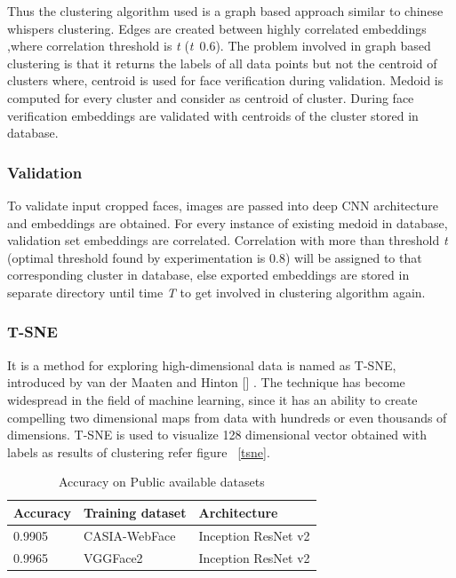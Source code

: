\documentclass[a4paper,12pt, twoside]{NITKReport}
\begin{document}
\par Thus the clustering algorithm used is a graph based approach similar to chinese whispers clustering. Edges are created between highly correlated embeddings ,where correlation threshold is \textit{t} (\textit{t}~0.6). The problem involved in graph based clustering is that it returns the labels of all data points but not the centroid of clusters where, centroid is used for face verification during validation. Medoid is computed for every cluster and consider as centroid of cluster. During face verification embeddings are validated with centroids of the cluster stored in database.

\subsubsection{Validation}
To validate input cropped faces, images are passed into deep CNN architecture and embeddings are obtained. For every instance of existing medoid in database, validation set embeddings are correlated. Correlation with more than threshold 
\textit{t} (optimal threshold found by experimentation is 0.8) will be assigned to that corresponding cluster in database, else exported embeddings are stored in separate directory until time \textit{T} to get involved in clustering algorithm again. 

\subsubsection{T-SNE}
It is a method for exploring high-dimensional data is named as T-SNE, introduced by van der Maaten and Hinton [\cite{maaten2008visualizing}] . The technique has become widespread in the field of machine learning, since it has an ability to create compelling two dimensional maps from data with hundreds or even thousands of dimensions. T-SNE is used to visualize 128 dimensional vector obtained with labels as results of clustering refer figure ~\ref{tsne}.

\begin{table}[h]
  \centering
\begin{tabular}{ |p{4cm}|p{4cm}|p{4cm}|}
\hline
Accuracy & Training dataset & Architecture\\
\hline
0.9905 & CASIA-WebFace & Inception ResNet v2 \\
\hline
0.9965 & VGGFace2 &	Inception ResNet v2 \\
\hline
\end{tabular}
\caption{Accuracy on Public available datasets}\label{table:acc_}
\end{table}
\end{document}
